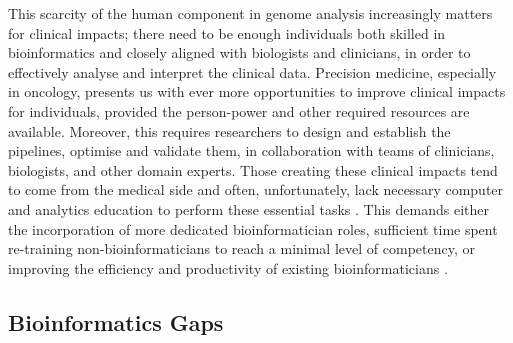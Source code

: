 This scarcity of the human component in genome analysis increasingly matters for clinical impacts; there need to be enough individuals both skilled in bioinformatics and closely aligned with biologists and clinicians, in order to effectively analyse and interpret the clinical data.
Precision medicine, especially in oncology, presents us with ever more opportunities to improve clinical impacts for individuals, provided the person-power and other required resources are available\cite{Wang_2011,Doble_2016}.
Moreover, this requires researchers to design and establish the pipelines, optimise and validate them, in collaboration with teams of clinicians, biologists, and other domain experts\cite{Mardis_2010}.
Those creating these clinical impacts tend to come from the medical side and often, unfortunately, lack necessary computer and analytics education to perform these essential tasks \cite{Ammenwerth_2010}.
This demands either the incorporation of more dedicated bioinformatician roles, sufficient time spent re-training non-bioinformaticians to reach a minimal level of competency, or improving the efficiency and productivity of existing bioinformaticians \cite{G_mez_L_pez_2017}.


\subsection{Bioinformatics Gaps}  %


